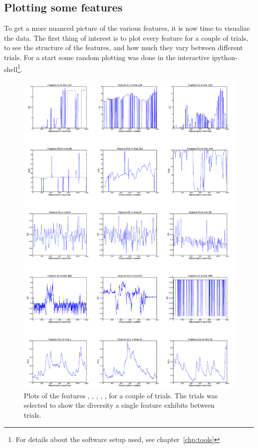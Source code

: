 \subsection{Plotting some features}\label{sec:plotting-features}
To get a more nuanced picture of the various features, it is now time to visualize the data. The first thing of interest is to plot every feature for a couple of trials, to see the structure of the features, and how much they vary between different trials. For a start some random plotting was done in the interactive ipython-shell\footnote{For details about the software setup used, see chapter~\ref{chp:tools}}. \par
\begin{figure}[!hbtp]
    \centering
        \includegraphics[width=\textwidth]{media/feature-plots-sheet.pdf}
    \caption{Plots of the features , , , , , for a couple of trials. The trials was selected to show the diversity a single feature exhibits between trials.}
    \label{fig:exploratory-feature-plots}
\end{figure}
